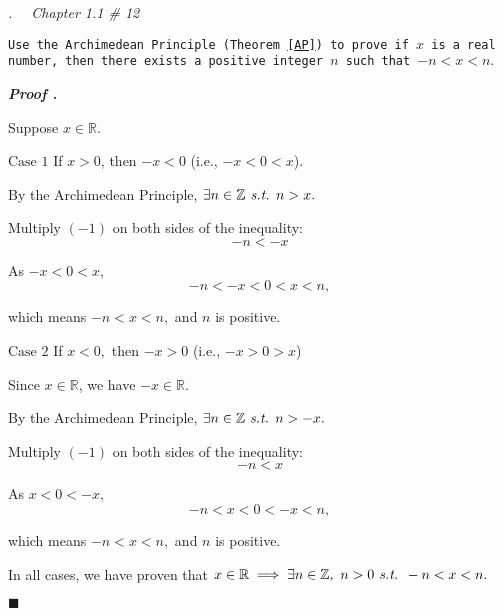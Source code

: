 \documentclass[10pt,letter]{article}
\newcounter{nq}[section]
\newcounter{np}[section]
\newenvironment*{p}{\par\noindent\textbf{\textit{Proof \stepcounter{np}\thenp. }}\par}{\par\hfill $\blacksquare$\par}
\newenvironment*{q}[1]{\noindent\emph{\thesection.\stepcounter{nq}\thenq$\quad $ #1}\par\noindent\texttt}{}
\def\Z{{\mathbb{Z}}}
\def\R{{\mathbb{R}}}
\def\st{\emph{ s.t. }}
\begin{document}
\begin{framed}\begin{q}
	{Chapter 1.1 \# 12}
	{Use the Archimedean Principle (Theorem \ref{AP}) to prove if $x$ is a real number, then there exists a positive integer $n$ such that $-n<x<n.$}
\end{q}\end{framed}
\begin{p}
	Suppose $x\in\R.$\par $\boxed{\text{Case }1}$ If $x>0$, then $-x<0$ (i.e., $-x<0<x$).\par\hspace{10mm} By the Archimedean Principle, $\exists n\in\Z\st n>x.$\par\hspace{10mm} Multiply $(-1)$ on both sides of the inequality: \[-n<-x\]\par\hspace{10mm} As $-x<0<x$, \[-n<-x<0<x<n,\]\par\hspace{10mm} which means $-n<x<n,$ and $n$ is positive.\par $\boxed{\text{Case }2}$ If $x<0,$ then $-x>0$ (i.e., $-x>0>x$)\par\hspace{10mm} Since $x\in\R$, we have $-x\in\R$.\par\hspace{10mm} By the Archimedean Principle, $\exists n\in\Z\st n>-x.$\par\hspace{10mm} Multiply $(-1)$ on both sides of the inequality: \[-n<x\]\par\hspace{10mm} As $x<0<-x,$ \[-n<x<0<-x<n,\]\par\hspace{10mm} which means $-n<x<n,$ and $n$ is positive.\par In all cases, we have proven that $x\in\R\implies\exists n\in\Z,\ n>0\st-n<x<n.$
\end{p}
\end{document}
